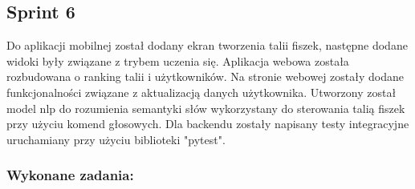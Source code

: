 \subsection{Sprint 6}

Do aplikacji mobilnej został dodany ekran tworzenia talii fiszek, następne dodane widoki były związane z trybem uczenia się. Aplikacja webowa została rozbudowana o ranking talii i użytkowników. Na stronie webowej zostały dodane funkcjonalności związane z aktualizacją danych użytkownika. Utworzony został model nlp do rozumienia semantyki słów wykorzystany do sterowania talią fiszek przy użyciu komend głosowych. Dla backendu zostały napisany testy integracyjne uruchamiany przy użyciu biblioteki "pytest".

\subsubsection{Wykonane zadania:}

